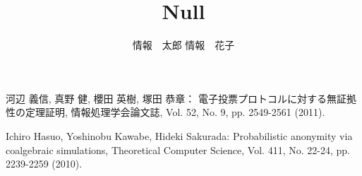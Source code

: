 \documentclass[a4j,8pt,twocolumn]{extarticle}
\title{Null}
\author{情報　太郎 \qquad 情報　花子}
\affiliation{情報大学情報学部}
\begin{document}
	
\maketitle
\thispagestyle{empty}	%




\begin{thebibliography}{9}
河辺 義信, 真野 健, 櫻田 英樹, 塚田 恭章：
電子投票プロトコルに対する無証拠性の定理証明,
情報処理学会論文誌,
Vol. 52, No. 9, pp. 2549-2561 (2011).

Ichiro Hasuo, Yoshinobu Kawabe, Hideki Sakurada:
Probabilistic anonymity via coalgebraic simulations,
Theoretical Computer Science,
Vol. 411, No. 22-24, pp. 2239-2259 (2010).
\end{thebibliography}


\end{document}
